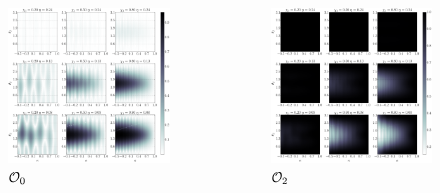 \documentclass[final,hyperref={pdfpagelabels=false}, 11pt]{beamer}
\begin{document}
\begin{frame}[t]
\begin{columns}[t]
\begin{column}{.59\textwidth}
\begin{columns}[t]
\begin{column}{.32\textwidth}
\begin{figure}[!htb]
\includegraphics[width=\linewidth]{figures/OLVP_0F_P0.pdf}
\caption{${\cal{O}}_{0}$}
\label{FIG:OLVP0}
\end{figure}
\end{column}

\begin{column}{.32\textwidth}
\begin{figure}[!htb]
\includegraphics[width=\linewidth]{figures/OLVP_0F_P2.pdf}
\caption{${\cal{O}}_{2}$}
\label{FIG:OLVP2}
\end{figure}
\end{column}


\end{columns}
\end{column}
\end{columns}
\end{frame}
\end{document}
